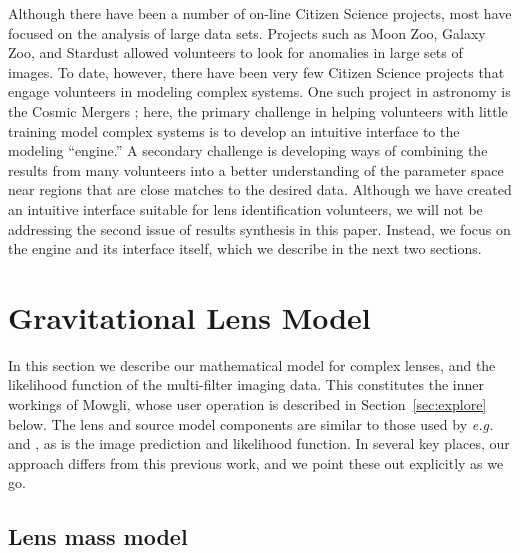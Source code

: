 \documentclass[iop]{emulateapj}
\def\eg{{\it e.g.}\,}
\def\theapplet{{\sc Mowgli}\xspace}
\begin{document}
Although there have been a number of on-line Citizen Science projects, most have
focused on the analysis of large data sets.   Projects such as  Moon Zoo, Galaxy
Zoo, and Stardust allowed volunteers to look for anomalies in large sets of
images.   To date, however, there have been very few Citizen Science projects
that engage volunteers in modeling complex systems. One such project in
astronomy is the Cosmic Mergers \citep{Hol++10,Wal++10};
here, the primary challenge in helping volunteers with  little training model
complex systems is to develop an intuitive interface to the modeling
``engine.''    A secondary challenge is developing ways of combining the results
from many volunteers into a better understanding of the parameter space near
regions that are close matches to the desired data.    Although we have created
an intuitive interface suitable for lens identification  volunteers, we will not
be addressing the second issue of results synthesis in this paper.  Instead, we
focus on the engine and its interface itself, which we describe in the next two
sections. 



\section{Gravitational Lens Model}
\label{sec:model}

In this section we describe our mathematical model for complex lenses, and the
likelihood function of the multi-filter imaging data. This constitutes the inner
workings of \theapplet, whose user operation is described in
Section~\ref{sec:explore} below. The lens and source model components are
similar to those used by \eg \citet{Mar++07} and \citet{Bre++10},  as is the
image prediction and likelihood function. In several key places, our approach
differs from this previous work, and we point these out explicitly as we go.


\subsection{Lens mass model}
\end{document}
